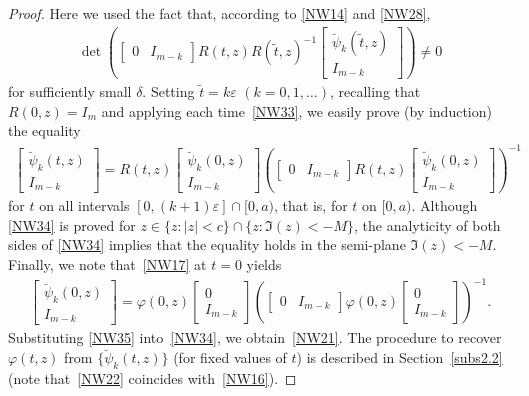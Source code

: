 \documentclass[pdftex]{sigma}
\def\vp{\varphi}
\def\ve{\varepsilon}
\def\wt{\widetilde}
\numberwithin{equation}{section}
\begin{document}
\begin{proof}
\noindent
Here we used the fact that, according to \eqref{NW14} and \eqref{NW28},
\begin{gather*}
\det \left(
  \begin{bmatrix}0 &I_{m-k} \end{bmatrix}
 R(t,z)R(\wt t,z)^{-1}\begin{bmatrix}\breve \psi_k(\wt t,z) \\ I_{m-k} \end{bmatrix} \right)\not=0
\end{gather*}
for suf\/f\/iciently small $\delta$. Setting $\wt t=k\ve \,\, (k=0,1, \ldots)$, recalling that $R(0,z)=I_m$ and applying each time~\eqref{NW33}, we easily prove (by induction) the equality
\begin{gather} \label{NW34}
\begin{bmatrix}\breve \psi_k( t,z) \\ I_{m-k} \end{bmatrix}
=
R(t,z)\begin{bmatrix}\breve \psi_k(0,z) \\ I_{m-k} \end{bmatrix}
 \left(
  \begin{bmatrix}0 &I_{m-k} \end{bmatrix}
 R(t,z)\begin{bmatrix}\breve \psi_k(0,z) \\ I_{m-k} \end{bmatrix} \right)^{-1}
\end{gather}
for $t$ on all intervals $[0, (k+1) \ve]\cap [0,a)$, that is, for $t$ on $[0,a)$. Although
\eqref{NW34} is proved for $ z \in \{z \colon |z|<c\}\cap \{z \colon \Im(z)<-M\}$, the analyticity
of both sides of \eqref{NW34} implies that the equality holds in the semi-plane $\Im(z)<-M$.
Finally, we note that~\eqref{NW17} at $t=0$ yields
\begin{gather} \label{NW35}
\begin{bmatrix}\breve \psi_k( 0,z) \\ I_{m-k} \end{bmatrix}
=
\vp(0,z)\begin{bmatrix}0 \\ I_{m-k} \end{bmatrix}
 \left(
  \begin{bmatrix}0 &I_{m-k} \end{bmatrix}
 \vp(0,z)\begin{bmatrix} 0 \\ I_{m-k} \end{bmatrix} \right)^{-1}.
\end{gather}
Substituting \eqref{NW35} into~\eqref{NW34}, we obtain~\eqref{NW21}. The procedure to recover
$\vp(t,z)$ from $\{\breve \psi_k(t,z)\}$ (for f\/ixed values of $t$) is described in Section~\ref{subs2.2}
(note that~\eqref{NW22} coincides with~\eqref{NW16}).
\end{proof}
\end{document}
